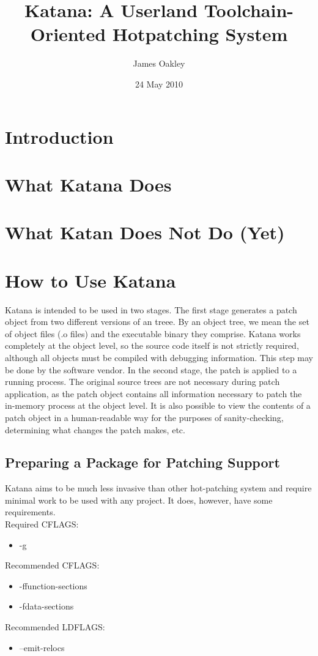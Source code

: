 \documentclass[11pt]{article}
\title{Katana: A Userland Toolchain-Oriented Hotpatching System}
\author{James Oakley}
\date{24 May 2010}
\begin{document}
\maketitle

\setcounter{tocdepth}{3}
\tableofcontents
\vspace*{1cm}

\section{Introduction}
\label{sec-1}

  
\section{What Katana Does}
\label{sec-2}

\section{What Katan Does Not Do (Yet)}
\label{sec-3}

\section{How to Use Katana}
\label{sec-4}

  Katana is intended to be used in two stages. The first stage
  generates a patch object from two different versions of an
  treee. By an object tree, we mean the set of object files (.o files)
  and the executable binary they comprise. Katana works completely at
  the object level, so the source code itself is not strictly
  required, although all objects must be compiled with debugging
  information. This step may be done by the software vendor. In the
  second stage, the patch is applied to a running process. The
  original source trees are not necessary during patch application, as
  the patch object contains all information necessary to patch the
  in-memory process at the object level. It is also possible to view
  the contents of a patch object in a human-readable way for the
  purposes of sanity-checking, determining what changes the patch
  makes, etc.
\subsection{Preparing a Package for Patching Support}
\label{sec-4.1}

   Katana aims to be much less invasive than other hot-patching system
   and require minimal work to be used with any project. It does,
   however, have some requirements.\\
   Required CFLAGS:
\begin{itemize}
\item -g
\end{itemize}
   Recommended CFLAGS:
\begin{itemize}
\item -ffunction-sections
\item -fdata-sections
\end{itemize}
   Recommended LDFLAGS:
\begin{itemize}
\item --emit-relocs
\end{itemize}
\end{document}
